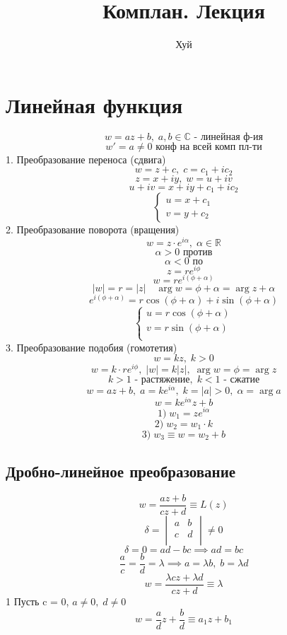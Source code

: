 \documentclass[a4paper]{article}
\begin{document}
\title{Комплан. Лекция}
\author{Хуй}
\maketitle
\section*{\centering Линейная функция}
\[
    w = az + b, \; a,b \in \mathbb{C}
    \text{ - линейная ф-ия}
\]
\[
    w' = a \neq 0 \text{ конф на всей комп пл-ти}
\]
1. Преобразование переноса (сдвига)
\[
    w = z + c, \; c = c_1 + i c_2
\]
\[
    z = x + iy, \; w = u + iv
\]
\[
    u + iv = x + iy + c_1 + i c_2
\]
\[
    \begin{cases}
        u  = x + c_1\\
        v = y + c_2
    \end{cases}
\]
2. Преобразование поворота (вращения)
\[
    w = z \cdot e^{i\alpha}, \; \alpha \in \mathbb{R}
\]
\[
    \alpha > 0 \text{ против}
\]
\[
    \alpha < 0 \text{ по}
\]
\[
    z = r e^{i\phi}
\]
\[
    w = r e^{i(\phi + \alpha)}
\]
\[
    |w| = r = |z| \quad \arg w = \phi + \alpha = \arg z + \alpha
\]
\[
    e^{i(\phi + \alpha)} = r \cos(\phi  +\alpha)  + i \sin (\phi + \alpha)
\]
\[
    \begin{cases}
        u = r \cos(\phi + \alpha) \\
        v = r \sin(\phi + \alpha) \\
    \end{cases}
\]
3. Преобразование подобия (гомотетия)
\[
    w = k z, \; k > 0
\]
\[
    w = k \cdot r e^{i\phi}, \; |w| = k |z|, \; \arg w = \phi = \arg z
\]
\[
    k > 1 \text{ - растяжение}, \; k < 1 \text{ - сжатие}
\]
\[
    w = az + b, \; a = k e^{i\alpha}, \; k = |a| > 0,\; \alpha = \arg a
\]
\[
    w = k e^{i\alpha}z + b
\]
\[
    1) \; w_1 = z e^{i\alpha}
\]
\[
    2) \; w_2 = w_1 \cdot k
\]
\[
    3) \; w_3 \equiv w = w_2 + b
\]
\subsection*{\centering Дробно-линейное преобразование}
\[
    w = \frac{az + b}{cz + d} \equiv L(z)
\]
\[
    \delta = \begin{vmatrix}
    a & b\\
    c & d\\
    
    \end{vmatrix}
    \neq 0    
\]
\[
    \delta = 0 = ad - bc \implies ad = bc
\]
\[
    \frac{a}{c} = \frac{b}{d} = \lambda \implies a = \lambda b,\; b = \lambda d
\]
\[
    w = \frac{\lambda cz + \lambda d}{c z + d} \equiv \lambda
\]
1 Пусть c = 0, $ a \neq 0, \; d \neq 0 $ 
\[
    w = \frac{a}{d} z  + \frac{b}{d} \equiv a_1 z + b_1
\]
\end{document}
